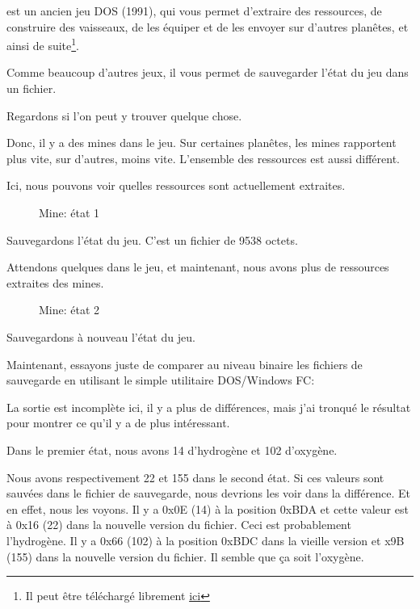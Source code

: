 ﻿
\label{Millenium_DOS_game}

 est un ancien jeu DOS (1991), qui vous permet d'extraire
des ressources, de construire des vaisseaux, de les équiper et de les envoyer sur d'autres
planêtes, et ainsi de suite\footnote{Il peut être téléchargé librement \href{http://thehouseofgames.org/index.php?t=10&id=110}{ici}}.

Comme beaucoup d'autres jeux, il vous permet de sauvegarder l'état du jeu dans un fichier.

Regardons si l'on peut y trouver quelque chose.

\clearpage
Donc, il y a des mines dans le jeu.
Sur certaines planêtes, les mines rapportent plus vite, sur d'autres, moins vite. 
L'ensemble des ressources est aussi différent.

Ici, nous pouvons voir quelles ressources sont actuellement extraites.

\begin{figure}[H]
\centering
{}
\caption{Mine: état 1}
\label{fig:mill_1}
\end{figure}

Sauvegardons l'état du jeu.
C'est un fichier de 9538 octets.

Attendons quelques  dans le jeu, et maintenant, nous avons plus de ressources
extraites des mines.

\begin{figure}[H]
\centering
{}
\caption{Mine: état 2}
\label{fig:mill_2}
\end{figure}

Sauvegardons à nouveau l'état du jeu.

Maintenant, essayons juste de comparer au niveau binaire les fichiers de sauvegarde
en utilisant le simple utilitaire DOS/Windows FC:



La sortie est incomplète ici, il y a plus de différences, mais j'ai tronqué le résultat
pour montrer ce qu'il y a de plus intéressant.

Dans le premier état, nous avons 14  d'hydrogène et 102  d'oxygène.

Nous avons respectivement 22 et 155  dans le second état.
Si ces valeurs sont sauvées dans le fichier de sauvegarde, nous devrions les voir
dans la différence.
Et en effet, nous les voyons.
Il y a 0x0E (14) à la position 0xBDA et cette valeur est à 0x16 (22) dans la nouvelle
version du fichier.
Ceci est probablement l'hydrogène.
Il y a 0x66 (102) à la position 0xBDC dans la vieille version et x9B (155) dans la
nouvelle version du fichier.
Il semble que ça soit l'oxygène.

